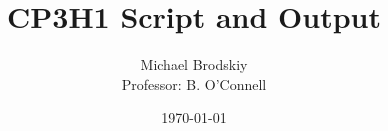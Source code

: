 


\title{CP3H1 Script and Output}
\date{\today}
\author{Michael Brodskiy\\ \small Professor: B. O'Connell}



\maketitle








